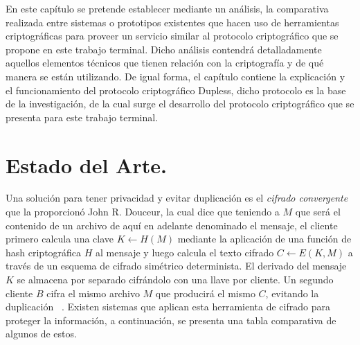 
En este capítulo se pretende establecer mediante un análisis, la comparativa realizada entre sistemas o prototipos existentes que hacen uso de herramientas criptográficas para proveer un servicio similar al protocolo criptográfico que se propone en este trabajo terminal. Dicho análisis contendrá detalladamente aquellos elementos técnicos que tienen relación con la criptografía y de qué manera se están utilizando. De igual forma, el capítulo contiene la explicación y el funcionamiento del protocolo criptográfico Dupless, dicho protocolo es la base de la investigación, de la cual surge el desarrollo del protocolo criptográfico que se presenta para este trabajo terminal. 






\section{Estado del Arte. }

Una solución para tener privacidad y evitar duplicación es el \textit{cifrado convergente} que la proporcionó John R. Douceur, la cual dice que teniendo a $M$ que será el contenido de un archivo de aquí en adelante denominado el mensaje, el cliente primero calcula una clave $K ← H(M)$ mediante la aplicación de una función de hash criptográfica $H$ al mensaje y luego calcula el texto cifrado $C ← E(K, M)$ a través de un esquema de cifrado simétrico determinista. El derivado del mensaje $K$ se almacena por separado cifrándolo con una llave por cliente. Un segundo cliente $B$ cifra el mismo archivo $M$ que producirá el mismo $C$, evitando la duplicación ~\cite{donceur}. Existen sistemas que aplican esta herramienta de cifrado para proteger la información, a continuación, se presenta una tabla comparativa de algunos de estos. \\




